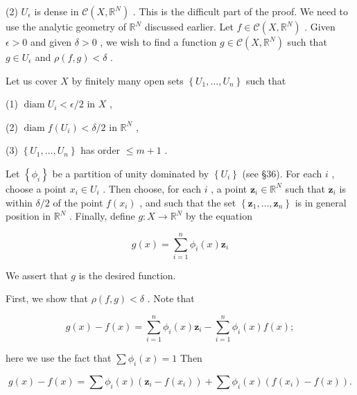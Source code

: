 \documentclass[10pt]{article}
\begin{document}
(2) \({U}_{\epsilon }\) is dense in \(\mathcal{C}\left( {X,{\mathbb{R}}^{N}}\right)\) . This is the difficult part of the proof. We need to use the analytic geometry of \({\mathbb{R}}^{N}\) discussed earlier. Let \(f \in  \mathcal{C}\left( {X,{\mathbb{R}}^{N}}\right)\) . Given \(\epsilon  > 0\) and given \(\delta  > 0\) , we wish to find a function \(g \in  \mathcal{C}\left( {X,{\mathbb{R}}^{N}}\right)\) such that \(g \in  {U}_{\epsilon }\) and \(\rho \left( {f,g}\right)  < \delta\) .

Let us cover \(X\) by finitely many open sets \(\left\{  {{U}_{1},\ldots ,{U}_{n}}\right\}\) such that

(1) \(\operatorname{diam}{U}_{i} < \epsilon /2\) in \(X\) ,

(2) \(\operatorname{diam}f\left( {U}_{i}\right)  < \delta /2\) in \({\mathbb{R}}^{N}\) ,

(3) \(\left\{  {{U}_{1},\ldots ,{U}_{n}}\right\}\) has order \(\leq  m + 1\) .

Let \(\left\{  {\phi }_{i}\right\}\) be a partition of unity dominated by \(\left\{  {U}_{i}\right\}\) (see §36). For each \(i\) , choose a point \({x}_{i} \in  {U}_{i}\) . Then choose, for each \(i\) , a point \({\mathbf{z}}_{i} \in  {\mathbb{R}}^{N}\) such that \({\mathbf{z}}_{i}\) is within \(\delta /2\) of the point \(f\left( {x}_{i}\right)\) , and such that the set \(\left\{  {{\mathbf{z}}_{1},\ldots ,{\mathbf{z}}_{n}}\right\}\) is in general position in \({\mathbb{R}}^{N}\) . Finally, define \(g : X \rightarrow  {\mathbb{R}}^{N}\) by the equation

\[
g\left( x\right)  = \mathop{\sum }\limits_{{i = 1}}^{n}{\phi }_{i}\left( x\right) {\mathbf{z}}_{i}
\]

We assert that \(g\) is the desired function.

First, we show that \(\rho \left( {f,g}\right)  < \delta\) . Note that

\[
g\left( x\right)  - f\left( x\right)  = \mathop{\sum }\limits_{{i = 1}}^{n}{\phi }_{i}\left( x\right) {\mathbf{z}}_{i} - \mathop{\sum }\limits_{{i = 1}}^{n}{\phi }_{i}\left( x\right) f\left( x\right) ;
\]

here we use the fact that \(\sum {\phi }_{i}\left( x\right)  = 1\) Then

\[
g\left( x\right)  - f\left( x\right)  = \sum {\phi }_{i}\left( x\right) \left( {{\mathbf{z}}_{i} - f\left( {x}_{i}\right) }\right)  + \sum {\phi }_{i}\left( x\right) \left( {f\left( {x}_{i}\right)  - f\left( x\right) }\right) .
\]
\end{document}
